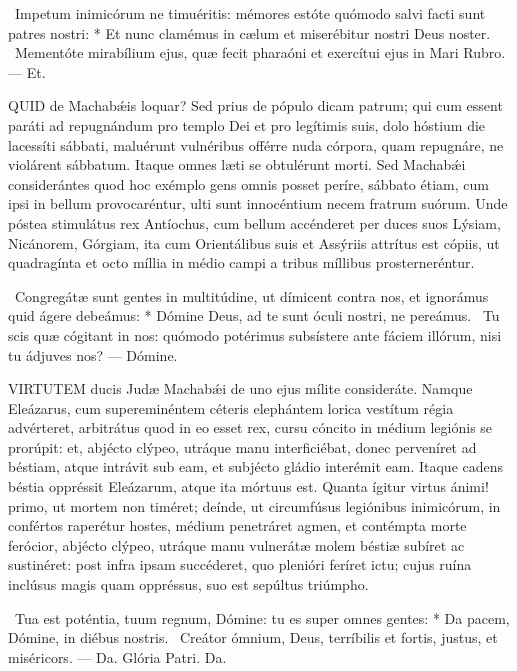 \R\ Impetum inimicórum ne timuéritis: mémores estóte quómodo salvi facti sunt patres nostri: * Et nunc clamémus in cælum et miserébitur nostri Deus noster. \V\ Mementóte mirabílium ejus, quæ fecit pharaóni et exercítui ejus in Mari Rubro. — Et.


\lettrine[lines=2]{Q}{UID} de Machabǽis loquar? Sed prius de pópulo dicam patrum; qui cum essent paráti ad repugnándum pro templo Dei et pro legítimis suis, dolo hóstium die lacessíti sábbati, maluérunt vulnéribus offérre nuda córpora, quam repugnáre, ne violárent sábbatum. Itaque omnes læti se obtulérunt morti. Sed Machabǽi considerántes quod hoc exémplo gens omnis posset períre, sábbato étiam, cum ipsi in bellum provocaréntur, ulti sunt innocéntium necem fratrum suórum. Unde póstea stimulátus rex Antíochus, cum bellum accénderet per duces suos Lýsiam, Nicánorem, Górgiam, ita cum Orientálibus suis et Assýriis attrítus est cópiis, ut quadragínta et octo míllia in médio campi a tribus míllibus prosterneréntur.

\R\ Congregátæ sunt gentes in multitúdine, ut dímicent contra nos, et ignorámus quid ágere debeámus: * Dómine Deus, ad te sunt óculi nostri, ne pereámus. \V\ Tu scis quæ cógitant in nos: quómodo potérimus subsístere ante fáciem illórum, nisi tu ádjuves nos? — Dómine.


\lettrine[lines=2]{V}{IRTUTEM} ducis Judæ Machabǽi de uno ejus mílite consideráte. Namque Eleázarus, cum supereminéntem céteris elephántem lorica vestítum régia advérteret, arbitrátus quod in eo esset rex, cursu cóncito in médium legiónis se prorúpit: et, abjécto clýpeo, utráque manu interficiébat, donec perveníret ad béstiam, atque intrávit sub eam, et subjécto gládio interémit eam. Itaque cadens béstia oppréssit Eleázarum, atque ita mórtuus est. Quanta ígitur virtus ánimi! primo, ut mortem non timéret; deínde, ut circumfúsus legiónibus inimicórum, in confértos raperétur hostes, médium penetráret agmen, et contémpta morte ferócior, abjécto clýpeo, utráque manu vulnerátæ molem béstiæ subíret ac sustinéret: post infra ipsam succéderet, quo plenióri feríret ictu; cujus ruína inclúsus magis quam oppréssus, suo est sepúltus triúmpho.

\R\ Tua est poténtia, tuum regnum, Dómine: tu es super omnes gentes: * Da pacem, Dómine, in diébus nostris. \V\ Creátor ómnium, Deus, terríbilis et fortis, justus, et miséricors. — Da. Glória Patri. Da.

